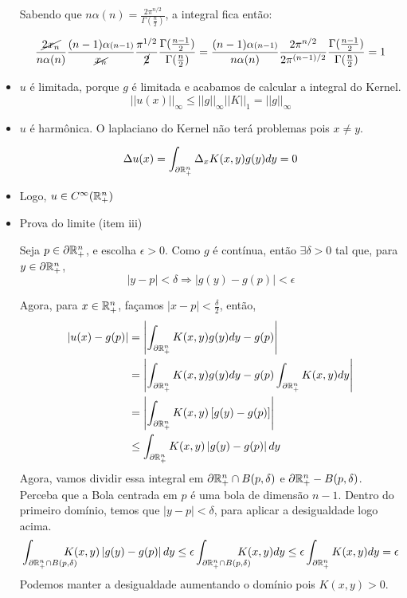 \documentclass[11pt]{article}
\newcommand{\p}{\partial}
\newcommand{\e}{\epsilon}
\begin{document}
\begin{itemize}
	Sabendo que \(n \alpha(n) = \frac{2\pi^{n/2}}{\Gamma(\frac{n}{2})}\), a integral fica então:
	
	\begin{equation*}
		\frac{\cancel{2x_n}}{n\alpha(n)} \frac{(n-1)\alpha{\scriptstyle (n-1)}}{\cancel{x_n}} \frac{\pi^{1/2}}{\cancel{2}} \frac{\Gamma(\frac{n-1}{2})}{\Gamma(\frac{n}{2})} = \frac{(n-1) \alpha{\scriptstyle (n-1)}}{n \alpha(n)} \frac{2\pi^{n/2} }{2\pi^{(n-1)/2}} \frac{\Gamma(\frac{n-1}{2})}{\Gamma(\frac{n}{2})} = 1
	\end{equation*}

	

	\item \(u\) é limitada, porque \(g\) é limitada e acabamos de calcular a integral do Kernel.\[||u(x)||_\infty \leq ||g||_\infty ||K||_1 = ||g||_\infty \]
	
	
	\item \(u\) é harmônica. O laplaciano do Kernel não terá problemas pois \(x \neq y \).
	
	\[\Delta u(x) = \int_{\p\seR} \Delta_x K(x,y) g(y) dy = 0\]
	
	\item Logo, \(u \in C^\infty(\mathbb{R}^n_+)\)
	
	\item Prova do limite (item iii)
	
	Seja \(p \in \p\seR\), e escolha \(\e > 0 \). Como \( g \) é contínua, então \(\exists \delta > 0\) tal que, para \(y \in \p\seR\),
	\[|y - p| < \delta \Rightarrow |g(y) - g(p)| < \e\]
	
	Agora, para \(x \in \mathbb{R}^n_+\), façamos \(|x - p| < \frac{\delta}{2}\), então,
	\begin{align*}
		|u(x) - g(p)| &= \left| \int_{\p\seR} K(x,y) g(y) dy -  g(p) \right| \\
		&= \left| \int_{\p\seR} K(x,y) g(y) dy -  g(p) \int_{\p\seR} K(x,y) dy \right| \\
		&= \left| \int_{\p\seR} K(x,y) \left[ g(y) -  g(p)\right] \right| \\
		&\leq  \int_{\p\seR} K(x,y) \left| g(y) -  g(p)\right| dy
	\end{align*}
	Agora, vamos dividir essa integral em \(\p\seR \cap B(p, \delta)\) e \(\p\seR - B(p, \delta)\). Perceba que a Bola centrada em \(p\) é uma bola de dimensão \(n-1\). Dentro do primeiro domínio, temos que \(|y-p| < \delta\), para aplicar a desigualdade logo acima.
	\[ \int_{\p\seR \cap B(p,\delta)}\hspace{-0.5cm} K(x,y) \left| g(y) - g(p) \right| dy \leq \e \int_{\p\seR \cap B(p,\delta)}\hspace{-0.5cm} K(x,y) dy \leq \e \int_{\p\seR} K(x,y) dy = \e \]
	Podemos manter a desigualdade aumentando o domínio pois \(K(x,y)>0\).
	

\end{itemize}
\end{document}

